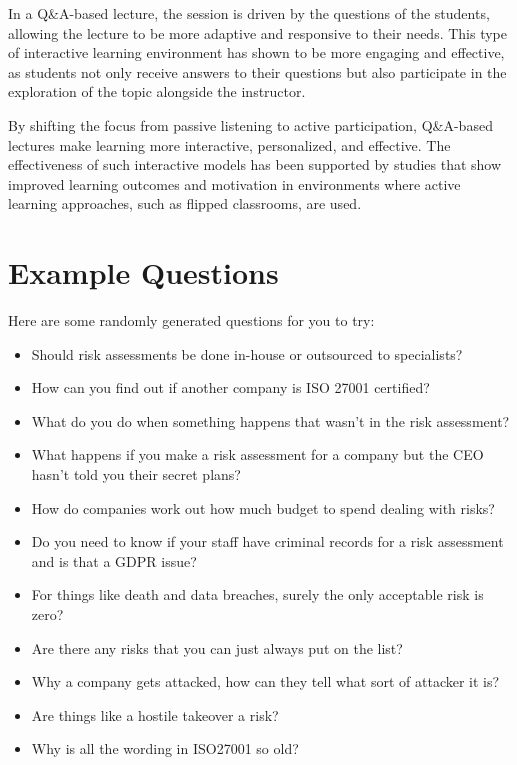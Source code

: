 \documentclass[12pt]{article}
\begin{document}
In a Q\&A-based lecture, the session is driven by the questions of the students, allowing the lecture to be more adaptive and responsive to their needs. This type of interactive learning environment has shown to be more engaging and effective, as students not only receive answers to their questions but also participate in the exploration of the topic alongside the instructor.\cite{ZhengLanqin2020TEot} 

By shifting the focus from passive listening to active participation, Q\&A-based lectures make learning more interactive, personalized, and effective. The effectiveness of such interactive models has been supported by studies that show improved learning outcomes and motivation in environments where active learning approaches, such as flipped classrooms, are used.\cite{ZhengLanqin2020TEot}

\section{Example Questions} 
Here are some randomly generated questions for you to try: 

\begin{itemize}
  \item Should risk assessments be done in-house or outsourced to specialists?
  \item How can you find out if another company is ISO 27001 certified?
  \item What do you do when something happens that wasn't in the risk assessment?
  \item What happens if you make a risk assessment for a company but the CEO hasn't told you their secret plans?
  \item How do companies work out how much budget to spend dealing with risks?
  \item Do you need to know if your staff have criminal records for a risk assessment and is that a GDPR issue?
  \item For things like death and data breaches, surely the only acceptable risk is zero?
  \item Are there any risks that you can just always put on the list?
  \item Why a company gets attacked, how can they tell what sort of attacker it is?
  \item Are things like a hostile takeover a risk?
  \item Why is all the wording in ISO27001 so old?
\end{itemize}
\end{document}
